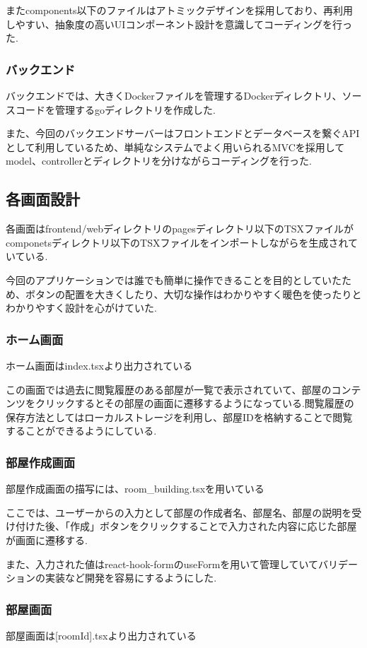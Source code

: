 \documentclass[submit,techrep]{ipsj}
\begin{document}
またcomponents以下のファイルはアトミックデザインを採用しており、再利用しやすい、抽象度の高いUIコンポーネント設計を意識してコーディングを行った.

\subsubsection{バックエンド}
バックエンドでは、大きくDockerファイルを管理するDockerディレクトリ、ソースコードを管理するgoディレクトリを作成した.

また、今回のバックエンドサーバーはフロントエンドとデータベースを繋ぐAPIとして利用しているため、単純なシステムでよく用いられるMVCを採用してmodel、controllerとディレクトリを分けながらコーディングを行った.

\subsection{各画面設計}
各画面はfrontend/webディレクトリのpagesディレクトリ以下のTSXファイルがcomponetsディレクトリ以下のTSXファイルをインポートしながらを生成されていている.

今回のアプリケーションでは誰でも簡単に操作できることを目的としていたため、ボタンの配置を大きくしたり、大切な操作はわかりやすく暖色を使ったりとわかりやすく設計を心がけていた.

\subsubsection{ホーム画面}
ホーム画面はindex.tsxより出力されている

この画面では過去に閲覧履歴のある部屋が一覧で表示されていて、部屋のコンテンツをクリックするとその部屋の画面に遷移するようになっている.閲覧履歴の保存方法としてはローカルストレージを利用し、部屋IDを格納することで閲覧することができるようにしている.

\subsubsection{部屋作成画面}
部屋作成画面の描写には、room\_building.tsxを用いている

ここでは、ユーザーからの入力として部屋の作成者名、部屋名、部屋の説明を受け付けた後、「作成」ボタンをクリックすることで入力された内容に応じた部屋が画面に遷移する.

また、入力された値はreact-hook-formのuseFormを用いて管理していてバリデーションの実装など開発を容易にするようにした.


\subsubsection{部屋画面}
部屋画面は[roomId].tsxより出力されている
\end{document}
